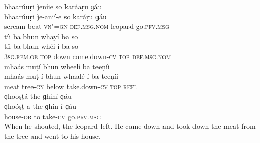 \begin{exe}
\ex
\label{ex:16}
\glll bhaarúuṛi	ǰeníie	so	karáaṛu	ɡáu \\
bhaarúuṛi	ǰe-anií-e	so	karáṛu	ɡáu \\
scream	beat-\textsc{vn"=gn}	\textsc{def.msg.nom}	leopard	go.\textsc{pfv.msg} \\
\glll tíi	ba	bhun	whayí	ba	so \\
tíi	ba	bhun	whéi-í	ba	so \\
\textsc{3sg.rem.ob} \textsc{top}	down	come.down-\textsc{cv} \textsc{top}	\textsc{def.msg.nom} \\
\glll mhaás	muṭí	bhun	wheelí	ba	teeṇíi \\
mhaás	muṭ-í	bhun	whaalé-í	ba	teeṇíi \\
meat	tree-\textsc{gn}	below	take.down-\textsc{cv} \textsc{top} 	\textsc{refl} \\
\glll ɡhooṣṭá	the	ɡhiní	ɡáu \\
ɡhoóṣṭ-a	the	ɡhin-í	ɡáu \\
house-\textsc{ob}	to	take-\textsc{cv}	go.\textsc{prv.msg} \\
\glt When he shouted, the leopard left. He came down and took down the meat from the tree and went to his house.

\end{exe}